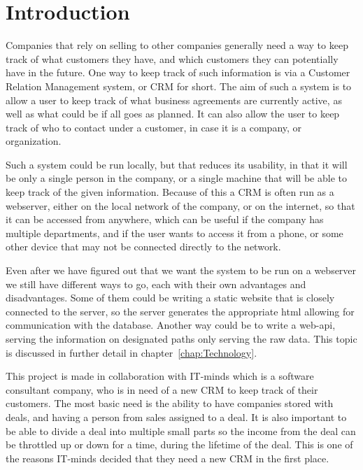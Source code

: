 \chapter{Introduction}
\label{chap:Introduction}
Companies that rely on selling to other companies generally need a way to keep track of
what customers they have, and which customers they can potentially have in the future.
One way to keep track of such information is via a Customer Relation Management system,
or CRM for short. The aim of such a system is to allow a user to keep track of what
business agreements are currently active, as well as what could be if all goes as planned.
It can also allow the user to keep track of who to contact under a customer, in case it is
a company, or organization.

Such a system could be run locally, but that reduces its usability, in that it will
be only a single person in the company, or a single machine that will be able to keep
track of the given information. Because of this a CRM is often run as a webserver, either
on the local network of the company, or on the internet, so that it can be accessed
from anywhere, which can be useful if the company has multiple departments, and if the
user wants to access it from a phone, or some other device that may not be connected
directly to the network.

Even after we have figured out that we want the system to be run on a webserver we still have
different ways to go, each with their own advantages and disadvantages. Some of them
could be writing a static website that is closely connected to the server, so the server
generates the appropriate html allowing for communication with the database.
Another way could be to write a web-api, serving the information on designated paths
only serving the raw data. This topic is discussed in further detail in chapter~\ref{chap:Technology}.

This project is made in collaboration with IT-minds which is a software consultant company,
who is in need of a new CRM to keep track of their customers. The most basic need is
the ability to have companies stored with deals, and having a person from sales assigned
to a deal. It is also important to be able to divide a deal into multiple small parts
so the income from the deal can be throttled up or down for a time, during the lifetime
of the deal. This is one of the reasons IT-minds decided that they need a new CRM in the
first place.

